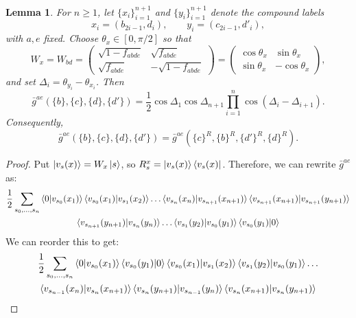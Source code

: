 \documentclass[aps,floatfix,10pt,amssymb,amsfont,amsmath,superscriptaddress,float,nofootinbib,longbibliography,nobalancelastpage,twocolumn]{revtex4-2}
\newtheorem{lemma}{Lemma}
\begin{document}
\begin{widetext}
\begin{multline}
\end{multline}
\begin{lemma}
\label{lemma:summed-history-reversal}
For $n\geq1$, let $\{x_i\}_{i=1}^{n+1}$ and $\{y_i\}_{i=1}^{n+1}$ denote
the compound labels
\begin{equation*}
    x_i=(b_{2i-1},d_i),\qquad y_i=(c_{2i-1},d'_i),
\end{equation*}
with $a,e$ fixed.  Choose $\theta_x\in[0,\pi/2]$ so that
\begin{equation*}
    W_x=W_{bd}=\begin{pmatrix}
                \sqrt{1 - f_{abde}} & \sqrt{f_{abde}}\\
       \sqrt{f_{abde}} & -\sqrt{1 - f_{abde}}
    \end{pmatrix}= \begin{pmatrix}\cos\theta_x&\sin\theta_x\\
    \sin\theta_x&-\cos\theta_x\end{pmatrix},
\end{equation*}
and set $\Delta_i=\theta_{y_i}-\theta_{x_i}$.  Then
\begin{equation}
    \bar g^{ae}(\{b\},\{c\},\{d\},\{d'\})
    =\frac12\cos\Delta_1\cos\Delta_{n+1}
      \prod_{i=1}^{n}\cos(\Delta_i-\Delta_{i+1}).
\end{equation}
Consequently,
\begin{equation}
    \bar g^{ae}(\{b\},\{c\},\{d\},\{d'\})
    =\bar g^{ae}(\{c\}^R,\{b\}^R,\{d'\}^R,\{d\}^R).
    \label{eq:PRR}
\end{equation}
\end{lemma}
\begin{proof}
Put $\ket{v_s(x)}=W_x\ket{s}$, so
$R_s^x=\ket{v_s(x)}\bra{v_s(x)}$. Therefore, we can rewrite $\bar g^{ae}$ as:
\begin{multline}
    \frac{1}{2}\sum_{s_0,\ldots,s_n} \braket{0|v_{s_0}(x_1)}\braket{v_{s_0}(x_1)|v_{s_1}(x_2)}\ldots \braket{v_{s_{n}}(x_{n})|v_{s_{n+1}}(x_{n+1})}\braket{v_{s_{n+1}}(x_{n+1})|v_{s_{n+1}}(y_{n+1})}\\\braket{v_{s_{n+1}}(y_{n+1})|v_{s_{n}}(y_{n})}\ldots\braket{v_{s_1}(y_2)|v_{s_0}(y_1)}\braket{v_{s_0}(y_1)|0}
\end{multline}
We can reorder this to get:
\begin{multline}
    \frac{1}{2}\sum_{s_0,\ldots,s_n} \braket{0|v_{s_0}(x_1)}\braket{v_{s_0}(y_1)|0}\braket{v_{s_0}(x_1)|v_{s_1}(x_2)}\braket{v_{s_1}(y_2)|v_{s_0}(y_1)}\ldots\\ \braket{v_{s_{n-1}}(x_{n})|v_{s_{n}}(x_{n+1})}\braket{v_{s_{n}}(y_{n+1})|v_{s_{n-1}}(y_{n})}\braket{v_{s_{n}}(x_{n+1})|v_{s_{n}}(y_{n+1})}

\end{multline}
\end{proof}
\end{widetext}
\end{document}
